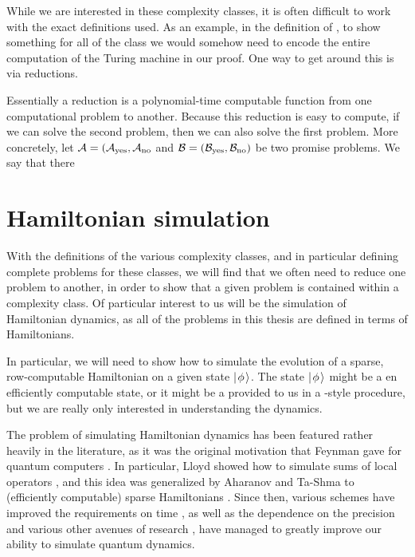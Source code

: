 \documentclass[../thesis-main/thesis-main]{subfiles}
\begin{document}
While we are interested in these complexity classes, it is often difficult to work with the exact definitions used.  As an example, in the definition of \NP, to show something for all of the class we would somehow need to encode the entire computation of the Turing machine in our proof.  One way to get around this is via reductions.

Essentially a reduction is a polynomial-time computable function from one computational problem to another.  Because this reduction is easy to compute, if we can solve the second problem, then we can also solve the first problem.  More concretely, let $\mathcal{A} = (\mathcal{A}_{\text{yes}},\mathcal{A}_{\text{no}}$ and $\mathcal{B}=(\mathcal{B}_{\text{yes}},\mathcal{B}_{\text{no}})$ be two promise problems.  We say that there 



\section{Hamiltonian simulation}\label{sec:hamiltonian_simulation}


With the definitions of the various complexity classes, and in particular defining complete problems for these classes, we will find that we often need to reduce one problem to another, in order to show that a given problem is contained within a complexity class.  Of particular interest to us will be the simulation of Hamiltonian dynamics, as all of the problems in this thesis are defined in terms of Hamiltonians.

In particular, we will need to show how to simulate the evolution of a sparse, row-computable Hamiltonian on a given state $|\mspace{2mu} \phi \mspace{2mu} \rangle$.  The state $|\mspace{2mu} \phi \mspace{2mu} \rangle$ might be a en efficiently computable state, or it might be a provided to us in a \QMA-style procedure, but we are really only interested in understanding the dynamics.

The problem of simulating Hamiltonian dynamics has been featured rather heavily in the literature, as it was the original motivation that Feynman gave for quantum computers \cite{Fey82,Fey85}.  In particular, Lloyd showed how to simulate sums of local operators \cite{Llo96}, and this idea was generalized by Aharanov and Ta-Shma to (efficiently computable) sparse Hamiltonians \cite{AT03}.  Since then, various schemes have improved the requirements on time \cite{BACS07,WBHS11,BC12}, as well as the dependence on the precision \cite{BCCKS14,BCCKS15} and various other avenues of research \cite{Chi09, PQSV11}, have managed to greatly improve our ability to simulate quantum dynamics.  
\end{document}
